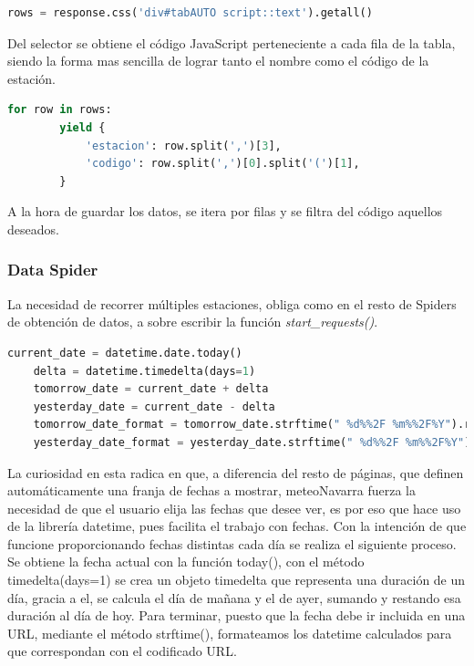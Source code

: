 \begin{lstlisting}[language=Python, caption={Selector en \textit{parse()} de MeteoNavarra Code Spider}]
	rows = response.css('div#tabAUTO script::text').getall()
\end{lstlisting}

Del selector se obtiene el código JavaScript perteneciente a cada fila de la tabla, siendo la forma mas sencilla de lograr tanto el nombre como el código de la estación.

\begin{lstlisting}[language=Python, caption={Guardado de datos de MeteoNavarra Code Spider}]	
	for row in rows:
		yield {
			'estacion': row.split(',')[3],
			'codigo': row.split(',')[0].split('(')[1],
		}
\end{lstlisting}

A la hora de guardar los datos, se itera por filas y se filtra del código aquellos deseados.

\subsubsection{Data Spider}
La necesidad de recorrer múltiples estaciones, obliga como en el resto de Spiders de obtención de datos, a sobre escribir la función \textit{start\_requests()}.

\begin{lstlisting}[language=Python, caption={Uso de fechas en función \textit{start\_requests()} MeteoNavarra Data Spider}]
	current_date = datetime.date.today()
	delta = datetime.timedelta(days=1)
	tomorrow_date = current_date + delta
	yesterday_date = current_date - delta
	tomorrow_date_format = tomorrow_date.strftime(" %d%%2F %m%%2F%Y").replace(' 0', '')
	yesterday_date_format = yesterday_date.strftime(" %d%%2F %m%%2F%Y").replace(' 0', '')
\end{lstlisting}

La curiosidad en esta radica en que, a diferencia del resto de páginas, que definen automáticamente una franja de fechas a mostrar, meteoNavarra fuerza la necesidad de que el usuario elija las fechas que desee ver, es por eso que hace uso de la librería datetime, pues facilita el trabajo con fechas.\newline
\newline
Con la intención de que funcione proporcionando fechas distintas cada día se realiza el siguiente proceso. Se obtiene la fecha actual con la función today(), con el método timedelta(days=1) se crea un objeto timedelta que representa una duración de un día, gracia a el, se calcula el día de mañana y el de ayer, sumando y restando esa duración al día de hoy. Para terminar, puesto que la fecha debe ir incluida en una URL, mediante el método strftime(), formateamos los datetime calculados para que correspondan con el codificado URL.\newline
\newline

